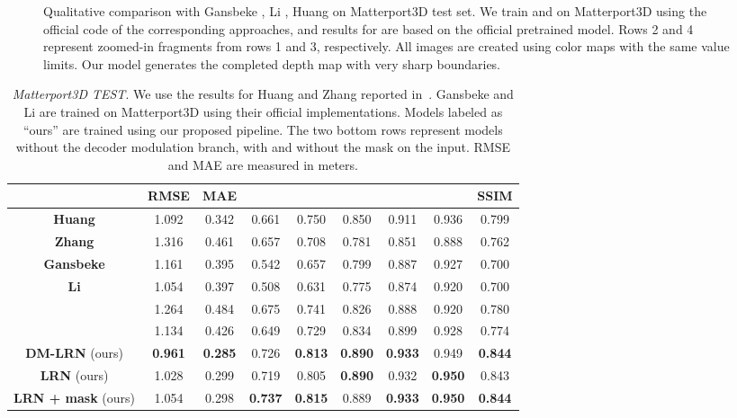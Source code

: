 \documentclass[final]{cvpr}
\begin{document}
\begin{figure*}[h]
    \caption{Qualitative comparison with Gansbeke \etal\cite{wvangansbeke_depth_2019}, Li \etal\cite{msg_chn}, Huang \etal\cite{Huang_2019} on Matterport3D test set. We train \cite{wvangansbeke_depth_2019} and \cite{msg_chn} on Matterport3D using the official code of the corresponding approaches, and results for \cite{Huang_2019} are based on the official pretrained model. Rows 2 and 4 represent zoomed-in fragments from rows 1 and 3, respectively. All images are created using color maps with the same value limits. Our model generates the completed depth map with very sharp boundaries.}
    \label{fig:mp3d_viz_test}
    \end{figure*}
    
    \begin{table*}[!th]
    \setlength{\tabcolsep}{8pt}
    \renewcommand{\arraystretch}{1.0}
    \centering
	\begin{tabular}{|c|c|c|c|c|c|c|c|c|}
	    \hline
	    & RMSE  & MAE  &   &   &   &   &   & SSIM  \\
		\hline
		\hline
		\textbf{Huang} \etal \cite{Huang_2019} & 1.092 & 0.342 & 0.661 & 0.750 & 0.850 & 0.911 & 0.936 & 0.799 \\
		\textbf{Zhang} \etal \cite{DBLP:journals/corr/abs-1803-09326} & 1.316 & 0.461 & 0.657 & 0.708 & 0.781 & 0.851 & 0.888 & 0.762 \\
		\textbf{Gansbeke} \etal \cite{wvangansbeke_depth_2019} & 1.161 & 0.395 & 0.542 & 0.657 & 0.799 & 0.887 & 0.927 & 0.700 \\
		\textbf{Li} \etal \cite{msg_chn} & 1.054 & 0.397 & 0.508 & 0.631 & 0.775 & 0.874 & 0.920 & 0.700 \\
		\makecell{\textbf{Gansbeke} \etal \cite{wvangansbeke_depth_2019} (ours)} & 1.264 & 0.484 & 0.675 & 0.741 & 0.826 & 0.888 & 0.920 & 0.780 \\
		\makecell{\textbf{Li} \etal \cite{msg_chn} (ours)} & 1.134 & 0.426 & 0.649 & 0.729 & 0.834 & 0.899 & 0.928 & 0.774 \\
		\hline
		\textbf{DM-LRN} (ours) & \textbf{0.961} & \textbf{0.285} & 0.726 & \textbf{0.813} & \textbf{0.890} & \textbf{0.933} & 0.949 & \textbf{0.844}\\
		\textbf{LRN} (ours) & 1.028 & 0.299 & 0.719 & 0.805 & \textbf{0.890} & 0.932 & \textbf{0.950} & 0.843 \\
		\textbf{LRN + mask} (ours) & 1.054 & 0.298 & \textbf{0.737} & \textbf{0.815} & 0.889 & \textbf{0.933} & \textbf{0.950} & \textbf{0.844} \\
		\hline
	\end{tabular}
	\vspace{0.1cm}
	\caption{\emph{Matterport3D TEST}. We use the results for Huang \etal \cite{Huang_2019} and Zhang \etal \cite{DBLP:journals/corr/abs-1803-09326} reported in~\cite{Huang_2019}. Gansbeke \etal \cite{wvangansbeke_depth_2019} and Li \etal \cite{msg_chn} are trained on Matterport3D using their official implementations. Models labeled as ``ours'' are trained using our proposed pipeline. The two bottom rows represent models without the decoder modulation branch, with and without the mask on the input. RMSE and MAE are measured in meters.}
	\label{tab:mp3d_test}
    \end{table*}
    
\end{document}
